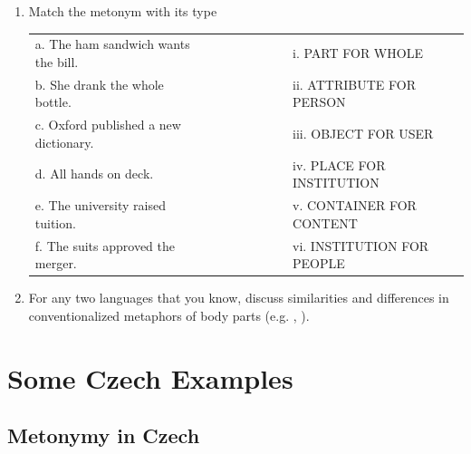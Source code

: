\documentclass[a4paper]{article}
\begin{document}
\begin{enumerate}
\item Match the metonym with its type
  \begin{center}
  \begin{tabular}{lcl}
  a. The ham sandwich wants the bill.&~~~~~~~~~~& i. PART FOR WHOLE \\[1.5ex]
b. She drank the whole bottle.&&ii. ATTRIBUTE FOR PERSON \\[1.5ex]
c. Oxford published a new dictionary.&&iii. OBJECT FOR USER\\[1.5ex]
d. All hands on deck.&&iv. PLACE FOR INSTITUTION \\[1.5ex]
e. The university raised tuition.&&v. CONTAINER FOR CONTENT  \\[1.5ex]
f. The suits approved the merger.&&vi. INSTITUTION FOR PEOPLE \\[1.5ex]
  \end{tabular}
\end{center}
\item For any two languages that you know, discuss similarities and
  differences in conventionalized metaphors of body parts
  (e.g. , ).
 \end{enumerate}
\newpage
 \section*{Some Czech Examples}


\subsection*{Metonymy in Czech}
\end{document}
